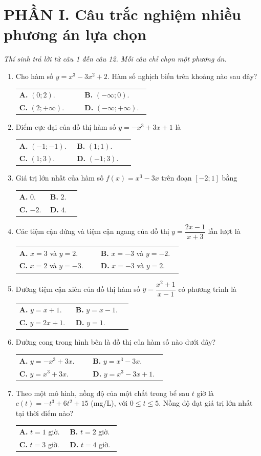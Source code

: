 \documentclass[12pt,a4paper]{article}
\makeatletter
\newcommand{\bonpa}[4]{\par\nobreak\smallskip\nobreak\noindent
\begin{tabular}{@{}p{0.47\linewidth}p{0.47\linewidth}@{}}
\textbf{A.} #1 & \textbf{B.} #2\\[8pt]
\textbf{C.} #3 & \textbf{D.} #4\end{tabular}}
\makeatother
\begin{document}
\section*{\large PHẦN I. Câu trắc nghiệm nhiều phương án lựa chọn}
\textit{Thí sinh trả lời từ câu 1 đến câu 12. Mỗi câu chỉ chọn một phương án.}
\begin{enumerate}
\item Cho hàm số $y=x^3-3x^2+2$. Hàm số nghịch biến trên khoảng nào sau đây?
\bonpa{$(0;2)$.}{$(-\infty;0)$.}{$(2;+\infty)$.}{$(-\infty;+\infty)$.}

\item Điểm cực đại của đồ thị hàm số $y=-x^3+3x+1$ là
\bonpa{$(-1;-1)$.}{$(1;1)$.}{$(1;3)$.}{$(-1;3)$.}

\item Giá trị lớn nhất của hàm số $f(x)=x^3-3x$ trên đoạn $[-2;1]$ bằng
\bonpa{$0$.}{$2$.}{$-2$.}{$4$.}

\item Các tiệm cận đứng và tiệm cận ngang của đồ thị $y=\dfrac{2x-1}{x+3}$ lần lượt là
\bonpa{$x=3$ và $y=2$.}{$x=-3$ và $y=-2$.}{$x=2$ và $y=-3$.}{$x=-3$ và $y=2$.}

\item Đường tiệm cận xiên của đồ thị hàm số $y=\dfrac{x^2+1}{x-1}$ có phương trình là
\bonpa{$y=x+1$.}{$y=x-1$.}{$y=2x+1$.}{$y=1$.}

\item Đường cong trong hình bên là đồ thị của hàm số nào dưới đây?
\par\nobreak\smallskip
\begin{minipage}[c]{0.60\linewidth}
\bonpa{$y=-x^3+3x$.}{$y=x^3-3x$.}{$y=x^3+3x$.}{$y=x^3-3x+1$.}
\end{minipage}\hfill
\begin{minipage}[c]{0.36\linewidth}\centering
{}
\end{minipage}

\item Theo một mô hình, nồng độ của một chất trong bể sau $t$ giờ là
$c(t)=-t^3+6t^2+15$ (mg/L), với $0\le t\le5$. Nồng độ đạt giá trị lớn nhất tại thời điểm nào?
\bonpa{$t=1$ giờ.}{$t=2$ giờ.}{$t=3$ giờ.}{$t=4$ giờ.}
\end{enumerate}
\end{document}
